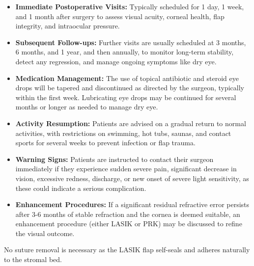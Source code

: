 \begin{itemize}
  \item \textbf{Immediate Postoperative Visits:} Typically scheduled for 1 day, 1 week, and 1 month after surgery to assess visual acuity, corneal health, flap integrity, and intraocular pressure.
  
  \item \textbf{Subsequent Follow-ups:} Further visits are usually scheduled at 3 months, 6 months, and 1 year, and then annually, to monitor long-term stability, detect any regression, and manage ongoing symptoms like dry eye.
  
  \item \textbf{Medication Management:} The use of topical antibiotic and steroid eye drops will be tapered and discontinued as directed by the surgeon, typically within the first week. Lubricating eye drops may be continued for several months or longer as needed to manage dry eye.
  
  \item \textbf{Activity Resumption:} Patients are advised on a gradual return to normal activities, with restrictions on swimming, hot tubs, saunas, and contact sports for several weeks to prevent infection or flap trauma.
  
  \item \textbf{Warning Signs:} Patients are instructed to contact their surgeon immediately if they experience sudden severe pain, significant decrease in vision, excessive redness, discharge, or new onset of severe light sensitivity, as these could indicate a serious complication.
  
  \item \textbf{Enhancement Procedures:} If a significant residual refractive error persists after 3-6 months of stable refraction and the cornea is deemed suitable, an enhancement procedure (either LASIK or PRK) may be discussed to refine the visual outcome.
\end{itemize}

No suture removal is necessary as the LASIK flap self-seals and adheres naturally to the stromal bed.

